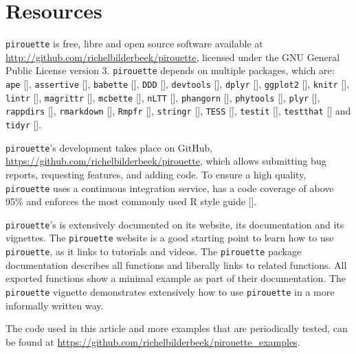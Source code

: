 \section{Resources}
\label{subsec:resources}

\verb;pirouette; is free, libre and open source software available at 
\url{http://github.com/richelbilderbeek/pirouette},
licensed under the GNU General Public License version 3.
\verb;pirouette; depends on multiple packages, which are:
\verb;ape; [\cite{ape}],
\verb;assertive; [\cite{assertive}],
\verb;babette; [\cite{bilderbeek2018babette}],
\verb;DDD; [\cite{DDD}],
\verb;devtools; [\cite{devtools}],
\verb;dplyr; [\cite{dplyr}],
\verb;ggplot2; [\cite{ggplot2}],
\verb;knitr; [\cite{knitr}],
\verb;lintr; [\cite{lintr}],
\verb;magrittr; [\cite{magrittr}],
\verb;mcbette; [\cite{mcbette}],
\verb;nLTT; [\cite{nLTT}],
\verb;phangorn; [\cite{phangorn}],
\verb;phytools; [\cite{phytools}],
\verb;plyr; [\cite{plyr}],
\verb;rappdirs; [\cite{rappdirs}],
\verb;rmarkdown; [\cite{rmarkdown}],
\verb;Rmpfr; [\cite{Rmpfr}],
\verb;stringr; [\cite{stringr}],
\verb;TESS; [\cite{TESS}],
\verb;testit; [\cite{testit}], 
\verb;testthat; [\cite{testthat}] and
\verb;tidyr; [\cite{tidyr}].

\verb;pirouette;'s development takes place on GitHub,
\url{https://github.com/richelbilderbeek/pirouette},
which allows submitting bug reports, requesting features, 
and adding code. To ensure a high quality, \verb;pirouette; 
uses a continuous integration service, has a code coverage of above 95\%
and enforces the most commonly used R style guide [\cite{style_guide}].

\verb;pirouette;'s is extensively documented on its website,
its documentation and its vignettes.
The \verb;pirouette; website is a good starting point to learn
how to use \verb;pirouette;, as it links to tutorials and videos.
The \verb;pirouette; package documentation describes
all functions and liberally links to related functions.
All exported functions show a minimal example as part of their documentation.
The \verb;pirouette; vignette demonstrates extensively how 
to use \verb;pirouette; in a more informally written way. 

The code used in this article and more examples that are periodically 
tested, can be found at 
\url{https://github.com/richelbilderbeek/pirouette_examples}. 

